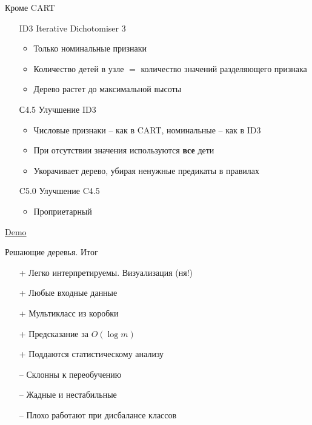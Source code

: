 \documentclass[aspectratio=169]{beamer}
\begin{document}
\begin{frame}{Кроме  CART}

\begin{itemize}

\item[ID3] Iterative Dichotomiser 3 
	\begin{itemize}
	\item Только номинальные признаки
	\item Количество детей в узле $=$ количество значений разделяющего признака
	\item Дерево растет до максимальной высоты
	\end{itemize}
	
\item[С4.5] Улучшение ID3
	\begin{itemize}
	\item Числовые признаки -- как в CART, номинальные -- как в ID3
	\item При отсутствии значения используются {\bf все} дети
	\item Укорачивает дерево, убирая ненужные предикаты в правилах
	\end{itemize}
	
\item[C5.0] Улучшение C4.5
	\begin{itemize}
	\item Проприетарный
	\end{itemize}
		
\end{itemize}

\end{frame}

\begin{frame}{\href{http://www.r2d3.us/visual-intro-to-machine-learning-part-1/}{Demo}}
\end{frame}

\begin{frame}{Решающие деревья. Итог}

\begin{itemize}
\item[+] Легко интерпретируемы. Визуализация (ня!)
\item[+] Любые входные данные
\item[+] Мультикласс из коробки
\item[+] Предсказание за $O(\log m)$
\item[+] Поддаются статистическому анализу
\end{itemize}

\begin{itemize}
\item[--] Склонны к переобучению
\item[--] Жадные и  нестабильные
\item[--] Плохо работают при дисбалансе классов
\end{itemize}

\end{frame}
\end{document}
